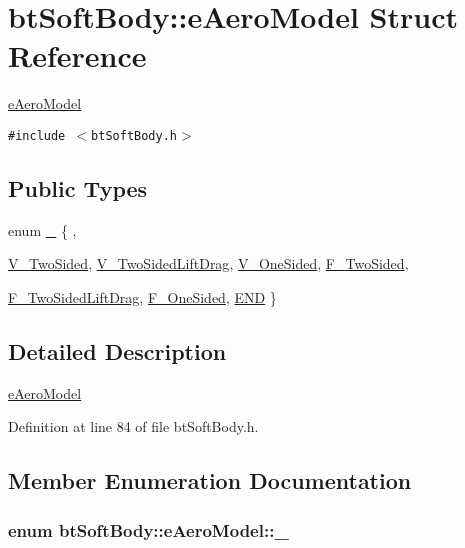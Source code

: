 \hypertarget{structbt_soft_body_1_1e_aero_model}{
\section{btSoftBody::eAeroModel Struct Reference}
\label{structbt_soft_body_1_1e_aero_model}
}
\hyperlink{structbt_soft_body_1_1e_aero_model}{eAeroModel}  


{\tt \#include $<$btSoftBody.h$>$}

\subsection*{Public Types}
\begin{CompactItemize}
\item 
enum \hyperlink{structbt_soft_body_1_1e_aero_model_147f4e50f7cfaa2855b5ea5b4b2986ae}{\_\-} \{ , \par
\hyperlink{structbt_soft_body_1_1e_aero_model_147f4e50f7cfaa2855b5ea5b4b2986ae112eb2723581b443eb31003e75769ced}{V\_\-TwoSided}, 
\hyperlink{structbt_soft_body_1_1e_aero_model_147f4e50f7cfaa2855b5ea5b4b2986ae91f6f6cec759e120ed1666ff684dae4a}{V\_\-TwoSidedLiftDrag}, 
\hyperlink{structbt_soft_body_1_1e_aero_model_147f4e50f7cfaa2855b5ea5b4b2986ae218d48cb6f6ce0640b193cc655ae05f7}{V\_\-OneSided}, 
\hyperlink{structbt_soft_body_1_1e_aero_model_147f4e50f7cfaa2855b5ea5b4b2986aeae33c1f5ebe9b125c044a4198b6ca3b4}{F\_\-TwoSided}, 
\par
\hyperlink{structbt_soft_body_1_1e_aero_model_147f4e50f7cfaa2855b5ea5b4b2986aebf0ee1be501b9fc3aafd6055c2a54c48}{F\_\-TwoSidedLiftDrag}, 
\hyperlink{structbt_soft_body_1_1e_aero_model_147f4e50f7cfaa2855b5ea5b4b2986ae975eb119297b6320316ed0cac16db8e3}{F\_\-OneSided}, 
\hyperlink{structbt_soft_body_1_1e_aero_model_147f4e50f7cfaa2855b5ea5b4b2986ae4b021d138b17f22f5e8fab9a253779f2}{END}
 \}
\end{CompactItemize}


\subsection{Detailed Description}
\hyperlink{structbt_soft_body_1_1e_aero_model}{eAeroModel} 

Definition at line 84 of file btSoftBody.h.

\subsection{Member Enumeration Documentation}
\hypertarget{structbt_soft_body_1_1e_aero_model_147f4e50f7cfaa2855b5ea5b4b2986ae}{
\subsubsection[\_\-]{\setlength{\rightskip}{0pt plus 5cm}enum {\bf btSoftBody::eAeroModel::\_\-}}}
\label{structbt_soft_body_1_1e_aero_model_147f4e50f7cfaa2855b5ea5b4b2986ae}


